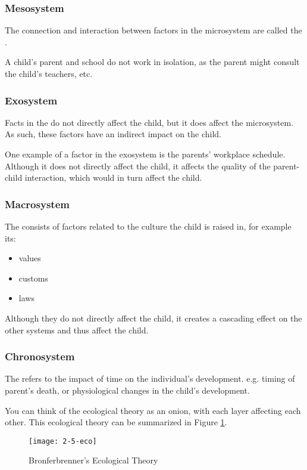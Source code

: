 \documentclass[../main/main.tex]{subfiles}
\begin{document}
\subsubsection{Mesosystem}
The connection and interaction between factors in the microsystem are called the . 

\begin{example}
A child's parent and school do not work in isolation, as the parent might consult the child's teachers, etc.
\end{example}
\subsubsection{Exosystem}
Facts in the  do not directly affect the child, but it does affect the microsystem. As such, these factors have an indirect impact on the child.
\begin{example}
One example of a factor in the exosystem is the parents' workplace schedule. Although it does not directly affect the child, it affects the quality of the  parent-child interaction, which would in turn affect the child.
\end{example}

\subsubsection{Macrosystem}
The  consists of factors related to the culture the child is raised in, for example its:
\begin{itemize}
\item values
\item customs
\item laws
\end{itemize}
Although they do not directly affect the child, it creates a cascading effect on the other systems and thus affect the child.
\subsubsection{Chronosystem}
The  refers to the impact of time on the individual's development.
e.g. timing of parent's death, or physiological changes in the child's development.

\begin{remark}
You can think of the ecological theory as an onion, with each layer affecting each other. This ecological theory can be summarized in Figure \ref{2-5-eco}.
\end{remark}
\begin{figure}[htpb]
  \centering
  \texttt{[image: 2-5-eco]}
  \caption{Bronferbrenner's Ecological Theory}
  \label{2-5-eco}
\end{figure}
\end{document}
